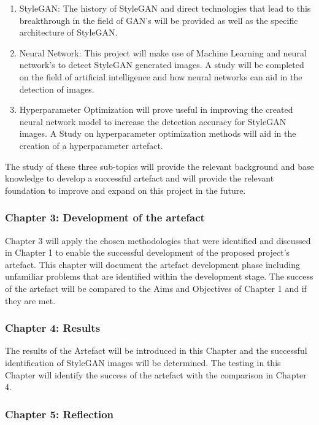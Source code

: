 \begin{enumerate}
    \item StyleGAN: The history of StyleGAN and direct technologies that lead to this breakthrough in the field of GAN’s will be provided as well as the specific architecture of StyleGAN.
    \item Neural Network: This project will make use of Machine Learning and neural network's to detect StyleGAN generated images. A study will be completed on the field of artificial intelligence and how neural networks can aid in the detection of images.
    \item Hyperparameter Optimization will prove useful in improving the created neural network model to increase the detection accuracy for StyleGAN images. A Study on hyperparameter optimization methods will aid in the creation of a hyperparameter artefact.
\end{enumerate}

The study of these three sub-topics will provide the relevant background and base knowledge to develop a successful artefact and will provide the relevant foundation to improve and expand on this project in the future.

\subsubsection*{Chapter 3: Development of the artefact}

Chapter 3 will apply the chosen methodologies that were identified and discussed in Chapter 1 to enable the successful development of the proposed project's artefact. This chapter will document the artefact development phase including unfamiliar problems that are identified within the development stage. The success of the artefact will be compared to the Aims and Objectives of Chapter 1 and if they are met.

\subsubsection*{Chapter 4: Results}

The results of the Artefact will be introduced in this Chapter and the successful identification of StyleGAN images will be determined. The testing in this Chapter will identify the success of the artefact with the comparison in Chapter 4.

\subsubsection*{Chapter 5: Reflection}

